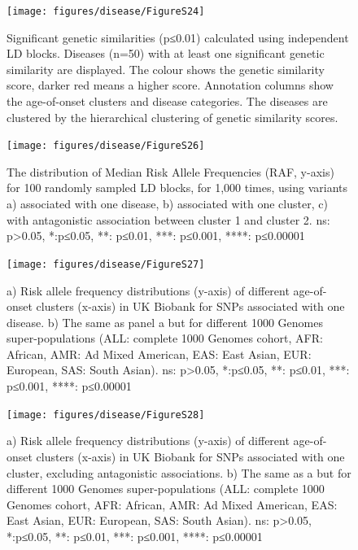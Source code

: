 \documentclass[12pt,twoside]{unicam}
\begin{document}
\begin{figure}

{\centering \texttt{[image: figures/disease/FigureS24]} 

}

\caption[Significant genetic similarities calculated using independent LD blocks.]{Significant genetic similarities (p≤0.01) calculated using independent LD blocks. Diseases (n=50) with at least one significant genetic similarity are displayed. The colour shows the genetic similarity score, darker red means a higher score. Annotation columns show the age-of-onset clusters and disease categories. The diseases are clustered by the hierarchical clustering of genetic similarity scores.}\label{fig:disFigS24}
\end{figure}

\begin{figure}

{\centering \texttt{[image: figures/disease/FigureS26]} 

}

\caption[The distribution of the median risk allele frequencies for LD blocks.]{The distribution of Median Risk Allele Frequencies (RAF, y-axis) for 100 randomly sampled LD blocks, for 1,000 times, using variants a) associated with one disease, b) associated with one cluster, c) with antagonistic association between cluster 1 and cluster 2. ns: p>0.05, *:p≤0.05, **: p≤0.01, ***: p≤0.001, ****: p≤0.00001}\label{fig:disFigS26}
\end{figure}

\begin{figure}

{\centering \texttt{[image: figures/disease/FigureS27]} 

}

\caption[Risk allele frequency distributions of different age-of-onset clusters for SNPs associated with one disease.]{a) Risk allele frequency distributions (y-axis) of different age-of-onset clusters (x-axis) in UK Biobank for SNPs associated with one disease. b) The same as panel a but for different 1000 Genomes super-populations (ALL: complete 1000 Genomes cohort, AFR: African, AMR: Ad Mixed American, EAS: East Asian, EUR: European, SAS: South Asian). ns: p>0.05, *:p≤0.05, **: p≤0.01, ***: p≤0.001, ****: p≤0.00001}\label{fig:disFigS27}
\end{figure}

\begin{figure}

{\centering \texttt{[image: figures/disease/FigureS28]} 

}

\caption[Risk allele frequency distributions of different age-of-onset clusters for SNPs associated with one cluster.]{a) Risk allele frequency distributions (y-axis) of different age-of-onset clusters (x-axis) in UK Biobank for SNPs associated with one cluster, excluding antagonistic associations. b) The same as a but for different 1000 Genomes super-populations (ALL: complete 1000 Genomes cohort, AFR: African, AMR: Ad Mixed American, EAS: East Asian, EUR: European, SAS: South Asian). ns: p>0.05, *:p≤0.05, **: p≤0.01, ***: p≤0.001, ****: p≤0.00001}\label{fig:disFigS28}
\end{figure}
\end{document}
